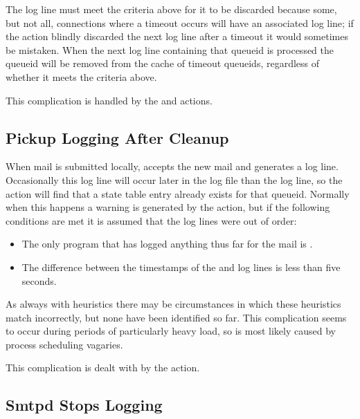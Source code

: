 The  log line must meet the criteria above for it to be
discarded because some, but not all, connections where a timeout occurs
will have an associated  log line; if the
 action blindly discarded the next
 log line after a timeout it would sometimes be mistaken.
When the next  log line containing that queueid is processed
the queueid will be removed from the cache of timeout queueids, regardless
of whether it meets the criteria above.

This complication is handled by the  and
 actions.

\subsection{Pickup Logging After Cleanup}

\label{pickup logging after cleanup}

When mail is submitted locally,  accepts the new mail and
generates a log line.  Occasionally this log line will occur later in the
log file than the  log line, so the  action
will find that a state table entry already exists for that queueid.
Normally when this happens a warning is generated by the 
action, but if the following conditions are met it is assumed that the log
lines were out of order:

\begin{itemize}

    \item The only program that has logged anything thus far for the mail
        is .

    \item The difference between the timestamps of the  and
         log lines is less than five seconds.

\end{itemize}

As always with heuristics there may be circumstances in which these
heuristics match incorrectly, but none have been identified so far.  This
complication seems to occur during periods of particularly heavy load, so
is most likely caused by process scheduling vagaries.

This complication is dealt with by the  action.

\subsection{Smtpd Stops Logging}

